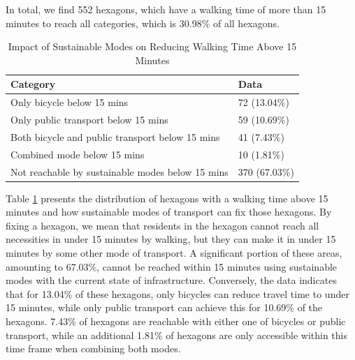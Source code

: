 In total, we find 552 hexagons, which have a walking time of more than 15 minutes to reach all categories, which is 30.98\% of all hexagons.
\begin{table}[h]
  \centering
  \begin{tabular}{|l|l|}
    \hline
    \textbf{Category}                                          & \textbf{Data}                \\ \hline
    Only bicycle below 15 mins                                 & 72 (13.04\%)                 \\ \hline
    Only public transport below 15 mins                        & 59 (10.69\%)                 \\ \hline
    Both bicycle and public transport below 15 mins            & 41 (7.43\%)                  \\ \hline
    Combined mode below 15 mins                                & 10 (1.81\%)                  \\ \hline
    Not reachable by sustainable modes below 15 mins           & 370 (67.03\%)                \\ \hline
  \end{tabular}
  \caption{Impact of Sustainable Modes on Reducing Walking Time Above 15 Minutes}
  \label{table:hexagons_with_walking_time_above_15_minutes}
\end{table}
Table \ref{table:hexagons_with_walking_time_above_15_minutes} presents the distribution of hexagons with a walking time above 15 minutes and how sustainable modes of transport can fix those hexagons.
By fixing a hexagon, we mean that residents in the hexagon cannot reach all necessities in under 15 minutes by walking, but they can make it in under 15 minutes by some other mode of transport.
A significant portion of these areas, amounting to 67.03\%, cannot be reached within 15 minutes using sustainable modes with the current state of infrastructure. 
Conversely, the data indicates that for 13.04\% of these hexagons, only bicycles can reduce travel time to under 15 minutes, while only public transport can achieve this for 10.69\% of the hexagons. 
7.43\% of hexagons are reachable with either one of bicycles or public transport, while an additional 1.81\% of hexagons are only accessible within this time frame when combining both modes. 


